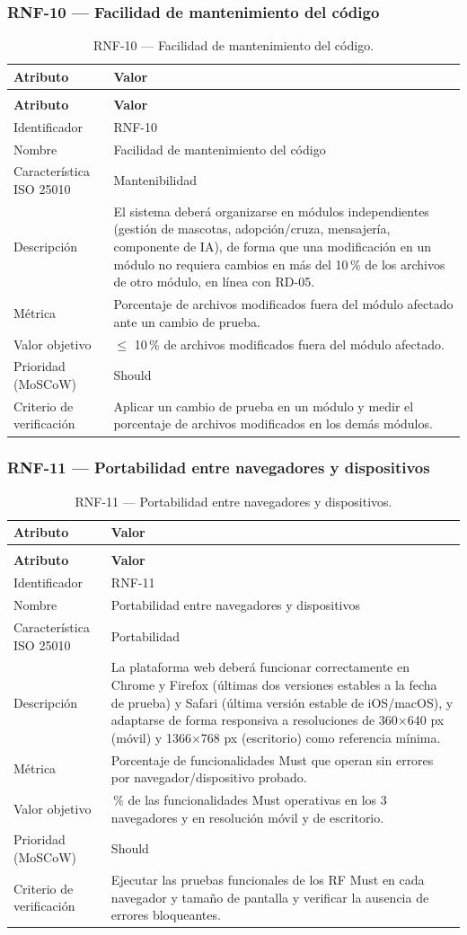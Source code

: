 \documentclass[journal,onecolumn]{IEEEtran}
\makeatletter
\newenvironment{atributos}[2]{%
	\small
	\begin{longtable}{@{}>{\raggedright\arraybackslash}p{4.2cm} >{\raggedright\arraybackslash}p{11.2cm}@{}}
		\caption{#2}\label{tab:#1}\\
		\toprule
		\textbf{Atributo} & \textbf{Valor} \\
		\midrule
		\endfirsthead
		\multicolumn{2}{@{}l}{\small\itshape (continuación)}\\
		\toprule
		\textbf{Atributo} & \textbf{Valor} \\
		\midrule
		\endhead
		\bottomrule
		\endlastfoot
	}{%
	\end{longtable}
	\normalsize
}
\makeatother
\begin{document}
	\subsubsection{RNF-10 --- Facilidad de mantenimiento del código}
	
	\begin{atributos}{RNF-10}{RNF-10 --- Facilidad de mantenimiento del código.}
		Identificador & RNF-10 \\
		Nombre & Facilidad de mantenimiento del código \\
		Característica ISO 25010 & Mantenibilidad \\
		Descripción & El sistema deberá organizarse en módulos independientes (gestión de mascotas, adopción/cruza, mensajería, componente de IA), de forma que una modificación en un módulo no requiera cambios en más del 10\,\% de los archivos de otro módulo, en línea con RD-05. \\
		Métrica & Porcentaje de archivos modificados fuera del módulo afectado ante un cambio de prueba. \\
		Valor objetivo & $\leq$ 10\,\% de archivos modificados fuera del módulo afectado. \\
		Prioridad (MoSCoW) & Should \\
		Criterio de verificación & Aplicar un cambio de prueba en un módulo y medir el porcentaje de archivos modificados en los demás módulos. \\
	\end{atributos}
	
	\subsubsection{RNF-11 --- Portabilidad entre navegadores y dispositivos}
	
	\begin{atributos}{RNF-11}{RNF-11 --- Portabilidad entre navegadores y dispositivos.}
		Identificador & RNF-11 \\
		Nombre & Portabilidad entre navegadores y dispositivos \\
		Característica ISO 25010 & Portabilidad \\
		Descripción & La plataforma web deberá funcionar correctamente en Chrome y Firefox (últimas dos versiones estables a la fecha de prueba) y Safari (última versión estable de iOS/macOS), y adaptarse de forma responsiva a resoluciones de 360×640 px (móvil) y 1366×768 px (escritorio) como referencia mínima. \\
		Métrica & Porcentaje de funcionalidades Must que operan sin errores por navegador/dispositivo probado. \\
		Valor objetivo & 100\,\% de las funcionalidades Must operativas en los 3 navegadores y en resolución móvil y de escritorio. \\
		Prioridad (MoSCoW) & Should \\
		Criterio de verificación & Ejecutar las pruebas funcionales de los RF Must en cada navegador y tamaño de pantalla y verificar la ausencia de errores bloqueantes. \\
	\end{atributos}
	
\end{document}
